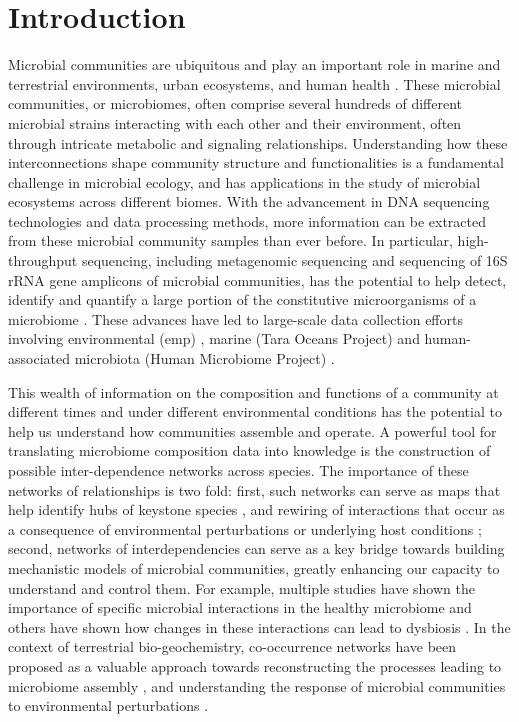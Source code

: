 
\section*{Introduction}

  Microbial communities are ubiquitous and play an important role in marine and terrestrial environments, urban ecosystems, and human health \cite{Ghoul2016,Thompson2017}.
  These microbial communities, or microbiomes, often comprise several hundreds of different microbial strains interacting with each other and their environment, often through intricate metabolic and signaling relationships.
  Understanding how these interconnections shape community structure and functionalities is a fundamental challenge in microbial ecology, and has applications in the study of microbial ecosystems across different biomes.
  With the advancement in DNA sequencing technologies \cite{Narihiro2017} and data processing methods,  more information can be extracted from these microbial community samples than ever before.
  In particular, high-throughput sequencing, including metagenomic sequencing and sequencing of 16S rRNA gene amplicons of microbial communities, has the potential to help detect, identify and quantify a large portion of the constitutive microorganisms of a microbiome \cite{Jovel2016,Lloyd-Price2016}.
  These advances have led to large-scale data collection efforts involving environmental (\acl{emp}) \cite{Thompson2017}, marine (Tara Oceans Project) \cite{Zhang2015} and human-associated microbiota (Human Microbiome Project) \cite{HumanMicrobiomeProjectConsortium2012}.

 This wealth of information on the composition and functions of a community at different times and under different environmental conditions has the potential to help us understand how communities assemble and operate.
 A powerful tool for translating microbiome composition data into knowledge is the construction of possible inter-dependence networks across species.
 The importance of these networks of relationships is two fold: first, such networks can serve as maps that help identify hubs of keystone species \cite{Menon2018,Rottjers2018}, and rewiring of interactions that occur as a consequence of environmental perturbations or underlying host conditions \cite{Gilbert2016}; second, networks of interdependencies can serve as a key bridge towards building mechanistic models of microbial communities, greatly enhancing our capacity to understand and control them.
 For example, multiple studies have shown the importance of specific microbial interactions in the healthy microbiome \cite{Lloyd-Price2016} and others have shown how changes in these interactions can lead to dysbiosis \cite{Wang2017,Gilbert2016,Belizario2015}.
 In the context of terrestrial bio-geochemistry, co-occurrence networks have been proposed as a valuable approach towards reconstructing the processes leading to microbiome assembly \cite{Fierer2017}, and understanding the response of microbial communities to environmental perturbations \cite{Jiao2019}.

